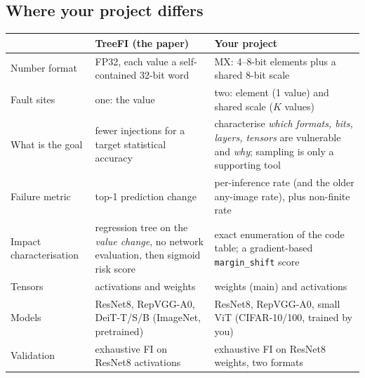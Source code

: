 \subsection{Where your project differs}
\begin{center}
\small
\begin{tabularx}{\linewidth}{@{}l>{\raggedright\arraybackslash}X>{\raggedright\arraybackslash}X@{}}
\toprule
 & TreeFI (the paper) & Your project \\
\midrule
Number format & FP32, each value a self-contained 32-bit word & MX: 4--8-bit elements plus a shared 8-bit scale \\
Fault sites & one: the value & two: element (1 value) and shared scale ($K$ values) \\
What is the goal & fewer injections for a target statistical accuracy & characterise \emph{which formats, bits, layers, tensors} are vulnerable and \emph{why}; sampling is only a supporting tool \\
Failure metric & top-1 prediction change & per-inference rate (and the older any-image rate), plus non-finite rate \\
Impact characterisation & regression tree on the \emph{value change}, no network evaluation, then sigmoid risk score & exact enumeration of the code table; a gradient-based \texttt{margin\_shift} score \\
Tensors & activations and weights & weights (main) and activations \\
Models & ResNet8, RepVGG-A0, DeiT-T/S/B (ImageNet, pretrained) & ResNet8, RepVGG-A0, small ViT (CIFAR-10/100, trained by you) \\
Validation & exhaustive FI on ResNet8 activations & exhaustive FI on ResNet8 weights, two formats \\
\bottomrule
\end{tabularx}
\end{center}

